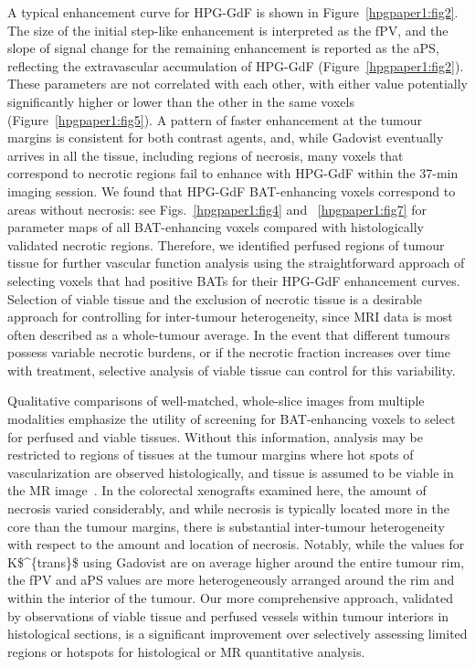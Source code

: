 A typical enhancement curve for \acs{HPG-GdF} is shown in Figure~\ref{hpgpaper1:fig2}.
The size of the initial step-like enhancement is interpreted as the \acs{fPV}, and the slope of signal change for the remaining enhancement is reported as the \acs{aPS}, reflecting the extravascular accumulation of \acs{HPG-GdF} (Figure~\ref{hpgpaper1:fig2}).
These parameters are not correlated with each other, with either value potentially significantly higher or lower than the other in the same voxels (Figure~\ref{hpgpaper1:fig5}).
A pattern of faster enhancement at the tumour margins is consistent for both contrast agents, and, while Gadovist eventually arrives in all the tissue, including regions of necrosis, many voxels that correspond to necrotic regions fail to enhance with \acs{HPG-GdF} within the 37-min imaging session.
We found that \acs{HPG-GdF} \acs{BAT}-enhancing voxels correspond to areas without necrosis: see Figs.~\ref{hpgpaper1:fig4} and ~\ref{hpgpaper1:fig7} for parameter maps of all \acs{BAT}-enhancing voxels compared with histologically validated necrotic regions.
Therefore, we identified perfused regions of tumour tissue for further vascular function analysis using the straightforward approach of selecting voxels that had positive \acs{BAT}s for their \acs{HPG-GdF} enhancement curves.
Selection of viable tissue and the exclusion of necrotic tissue is a desirable approach for controlling for inter-tumour heterogeneity, since MRI data is most often described as a whole-tumour average.
In the event that different tumours possess variable necrotic burdens, or if the necrotic fraction increases over time with treatment, selective analysis of viable tissue can control for this variability.

Qualitative comparisons of well-matched, whole-slice images from multiple modalities emphasize the utility of screening for \acs{BAT}-enhancing voxels to select for perfused and viable tissues.
Without this information, analysis may be restricted to regions of tissues at the tumour margins where hot spots of vascularization are observed histologically, and tissue is assumed to be viable in the MR image~\cite{Pathak:2005gu,Li:2005gw}.
In the colorectal xenografts examined here, the amount of necrosis varied considerably, and while necrosis is typically located more in the core than the tumour margins, there is substantial inter-tumour heterogeneity with respect to the amount and location of necrosis.
Notably, while the values for \acs{K$^{trans}$} using Gadovist are on average higher around the entire tumour rim, the \acs{fPV} and \acs{aPS} values are more heterogeneously arranged around the rim and within the interior of the tumour.
Our more comprehensive approach, validated by observations of viable tissue and perfused vessels within tumour interiors in histological sections, is a significant improvement over selectively assessing limited regions or hotspots for histological or MR quantitative analysis.

